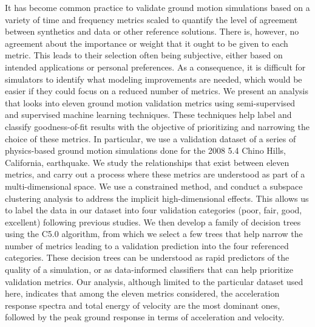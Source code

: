 %
It has become common practice to validate ground motion simulations based on a variety of time and frequency metrics scaled to quantify the level of agreement between synthetics and data or other reference solutions. There is, however, no agreement about the importance or weight that it ought to be given to each metric. This leads to their selection often being subjective, either based on intended applications or personal preferences. As a consequence, it is difficult for simulators to identify what modeling improvements are needed, which would be easier if they could focus on a reduced number of metrics. We present an analysis that looks into eleven ground motion validation metrics using semi-supervised and supervised machine learning techniques. These techniques help label and classify goodness-of-fit results with the objective of prioritizing and narrowing the choice of these metrics. In particular, we use a validation dataset of a series of physics-based ground motion simulations done for the 2008  5.4 Chino Hills, California, earthquake. We study the relationships that exist between eleven metrics, and carry out a process where these metrics are understood as part of a multi-dimensional space. We use a constrained \kmeans{} method, and conduct a subspace clustering analysis to address the implicit high-dimensional effects. This allows us to label the data in our dataset into four validation categories (poor, fair, good, excellent) following previous studies. We then develop a family of decision trees using the C5.0 algorithm, from which we select a few trees that help narrow the number of metrics leading to a validation prediction into the four referenced categories. These decision trees can be understood as rapid predictors of the quality of a simulation, or as data-informed classifiers that can help prioritize validation metrics. Our analysis, although limited to the particular dataset used here, indicates that among the eleven metrics considered, the acceleration response spectra and total energy of velocity are the most dominant ones, followed by the peak ground response in terms of acceleration and velocity.
